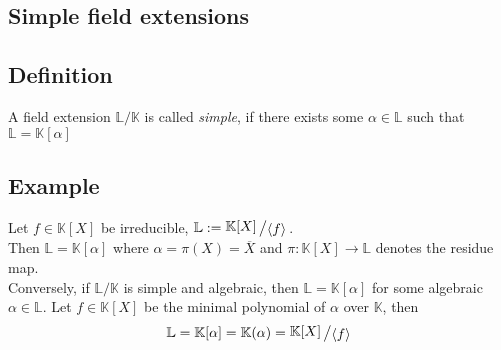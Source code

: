 \documentclass[12pt]{book}
\newcommand{\slant}[2]{{\raisebox{.1em}{$#1$}\left/\raisebox{-.1em}{$#2$}\right.}}
\begin{document}
\begin{spacing}{1.3}

\renewcommand*\thesection{\S\ \arabic{section}\quad}
\section{Simple field extensions}
\renewcommand*\thesection{\arabic{section}}

\subsection{Definition} %
A field extension $\mathbb{L}/\mathbb{K}$ is called \textit{simple}, if there exists some $\alpha \in \mathbb{L}$ such that $\mathbb{L}=\mathbb{K}[\alpha]$

\subsection*{Example} %
\titleformat{\subsection}{\normalfont\normalsize\bfseries}{}{0em}{#1 \thesubsection}
Let $f \in \mathbb{K}[X]$ be irreducible, $\mathbb{L}:=\slant{\mathbb{K}[X]}{\langle f\rangle}$.\\
Then $\mathbb{L}=\mathbb{K}[\alpha]$ where $\alpha= \pi(X)=\overline{X}$ and $\pi: \mathbb{K}[X] \longrightarrow \mathbb{L}$ denotes the residue map.\\
Conversely, if $\mathbb{L}/\mathbb{K}$ is simple and algebraic, then $\mathbb{L}=\mathbb{K}[\alpha]$ for some algebraic $\alpha \in \mathbb{L}$. Let $f \in  \mathbb{K}[X]$ be the minimal polynomial of $\alpha$ over $\mathbb{K}$, then $$\mathbb{L}=\mathbb{K}[\alpha]=\mathbb{K}(\alpha)=\slant{\mathbb{K}[X]}{\langle f \rangle}$$


\end{spacing}
\end{document}
